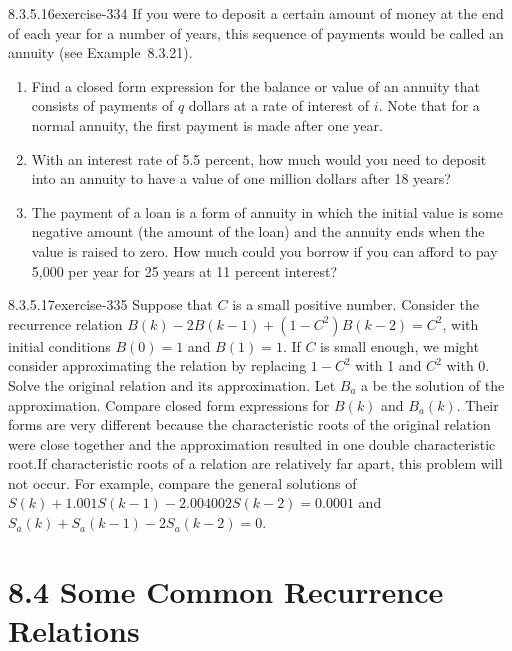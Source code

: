 \documentclass[twoside,10pt,]{book}
\numberwithin{equation}{section}
\begin{document}
\begin{divisionsolution}{8.3.5.16}{}{exercise-334}%
\hypertarget{p-2748}{}%
If you were to deposit a certain amount of money at the end of each year for a number of years, this sequence of payments would be called an annuity (see Example~8.3.21).\leavevmode%
\begin{enumerate}[label=(\alph*)]
\item\hypertarget{li-1360}{}\hypertarget{p-2749}{}%
Find a closed form expression for the balance or value of an annuity that consists of payments of \(q\) dollars at a rate of interest of \(i\). Note that for a normal annuity, the first payment is made after one year.%
\item\hypertarget{li-1361}{}\hypertarget{p-2750}{}%
With an interest rate of 5.5 percent, how much would you need to deposit into an annuity to have a value of one million dollars after 18 years?%
\item\hypertarget{li-1362}{}\hypertarget{p-2751}{}%
The payment of a loan is a form of annuity in which the initial value is some negative amount (the amount of the loan) and the annuity ends when the value is raised to zero. How much could you borrow if you can afford to pay \textdollar{}5,000 per year for 25 years at 11 percent interest?%
\end{enumerate}
%
\end{divisionsolution}%
\begin{divisionsolution}{8.3.5.17}{}{exercise-335}%
\hypertarget{p-2752}{}%
Suppose that \(C\) is a small positive number. Consider the recurrence relation \(B(k) - 2B(k - 1) + \left(1 - C ^2\right)B(k - 2)
= C^2\), with initial conditions \(B(0) = 1\) and \(B(1) = 1\). If \(C\) is small enough, we might consider approximating the relation by replacing \(1 - C^2\) with 1 and \(C^2\) with 0. Solve the original relation and its approximation. Let \(B_a\) a be the solution of the approximation. Compare closed form expressions for \(B(k)\) and \(B_a(k)\). Their forms are very different because the characteristic roots of the original relation were close together and the approximation resulted in one double characteristic root.If characteristic roots of a relation are relatively far apart, this problem will not occur. For example, compare the general solutions of \(S(k) + 1.001S(k - 1) - 2.004002 S(k - 2) = 0.0001\) and \(S_a(k) + S_a(k - 1) - 2S_a(k - 2) = 0\).%
\end{divisionsolution}%
\section*{8.4 Some Common Recurrence Relations}
\end{document}
